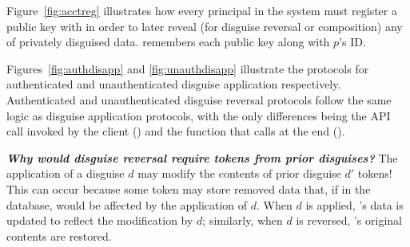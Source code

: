 \begin{figure*}[h!]
\caption{\textbf{Principal public key registration.}}
\label{fig:acctreg}
\end{figure*} 
Figure~\ref{fig:acctreg} illustrates how every principal in the system must register a public key with \sys in order to later reveal (for disguise reversal or composition) any of privately disguised data. \sys remembers each public key  along with $p$'s ID.

Figures~\ref{fig:authdisapp} and \ref{fig:unauthdisapp} illustrate the protocols for authenticated
and unauthenticated disguise application respectively. Authenticated and unauthenticated disguise
reversal protocols follow the same logic as disguise application protocols, with the only
differences being the API call invoked by the client () and the
function that \sys calls at the end ().

\vspace{6pt}\noindent\textbf{\emph{Why would disguise reversal require tokens from prior disguises?}} 
The application of a disguise $d$ may modify the contents of prior disguise $d'$ tokens!
This can occur because some token \tdata{} may store removed data that, if in the database, would be
affected by the application of $d$. When $d$ is applied, \tdata{}'s data is updated to reflect the
modification by $d$; similarly, when $d$ is reversed, \tdata{}'s original contents are restored.

